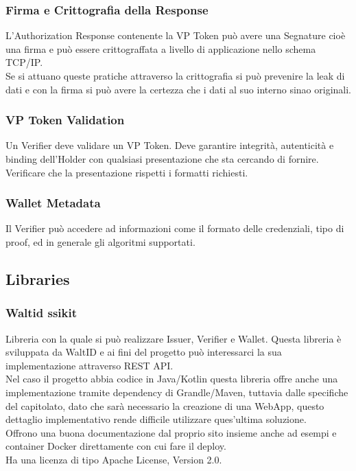 \subsubsection{Firma e Crittografia della Response}
L'Authorization Response contenente la VP Token può avere una Segnature cioè una firma e può essere crittograffata
a livello di applicazione nello schema TCP/IP.\\
Se si attuano queste pratiche attraverso la crittografia si può prevenire la leak di dati e con la firma si può avere la certezza che 
i dati al suo interno sinao originali.

\subsubsection{VP Token Validation}
Un Verifier deve validare un VP Token. Deve garantire integrità, autenticità e binding dell'Holder con qualsiasi presentazione che sta cercando di fornire.
Verificare che la presentazione rispetti i formatti richiesti.

\subsubsection{Wallet Metadata}
Il Verifier può accedere ad informazioni come il formato delle credenziali, tipo di proof, ed in generale gli algoritmi supportati.

\subsection{Libraries}
\subsubsection{Waltid ssikit}
Libreria con la quale si può realizzare Issuer, Verifier e Wallet.
Questa libreria è sviluppata da WaltID e ai fini del progetto può interessarci la sua implementazione attraverso REST API.\\
Nel caso il progetto abbia codice in Java/Kotlin questa libreria offre anche una implementazione tramite dependency di Grandle/Maven, tuttavia 
dalle specifiche del capitolato, dato che sarà necessario la creazione di una WebApp, questo dettaglio implementativo rende 
difficile utilizzare ques'ultima soluzione.\\
Offrono una buona documentazione dal proprio sito insieme anche ad esempi e container Docker direttamente con cui fare il deploy.\\
Ha una licenza di tipo  Apache License, Version 2.0.

